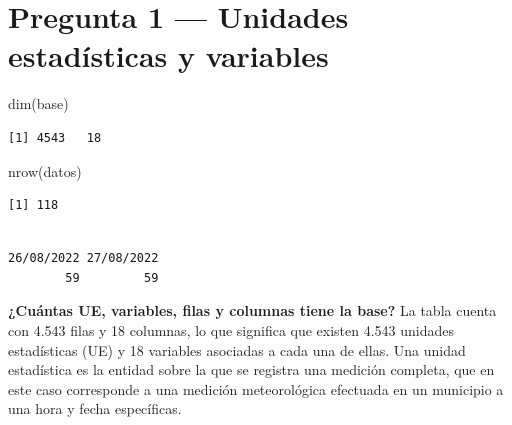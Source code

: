 \documentclass[oneside, openany, fontset=libertinus]{mitthesis}
\newenvironment{Shaded}{\begin{snugshade}}{\end{snugshade}}
\newcommand{\FunctionTok}[1]{\textcolor[rgb]{0.28,0.35,0.67}{#1}}
\newcommand{\NormalTok}[1]{\textcolor[rgb]{0.00,0.23,0.31}{#1}}
\newcommand{\SpecialCharTok}[1]{\textcolor[rgb]{0.37,0.37,0.37}{#1}}
\newenvironment{codres}%
  {\par\smallskip\noindent\begin{minipage}[t]{0.57\linewidth}\vspace{0pt}}%
  {\end{minipage}\par\medskip}
\newcommand{\codressep}{\end{minipage}\hfill\begin{minipage}[t]{0.40\linewidth}\vspace{0pt}}
\begin{document}
\section{Pregunta 1 --- Unidades estadísticas y variables}\label{p1}

\begin{codres}

\begin{Shaded}
\begin{Highlighting}[]
\FunctionTok{dim}\NormalTok{(base)}
\end{Highlighting}
\end{Shaded}

\codressep

\begin{verbatim}
[1] 4543   18
\end{verbatim}

\end{codres}

\begin{codres}

\begin{Shaded}
\begin{Highlighting}[]
\FunctionTok{nrow}\NormalTok{(datos)}
\end{Highlighting}
\end{Shaded}

\codressep

\begin{verbatim}
[1] 118
\end{verbatim}

\end{codres}

\begin{codres}

\begin{Shaded}
\end{Shaded}

\codressep

\begin{verbatim}

26/08/2022 27/08/2022 
        59         59 
\end{verbatim}

\end{codres}

\textbf{¿Cuántas UE, variables, filas y columnas tiene la base?} La
tabla cuenta con 4.543 filas y 18 columnas, lo que significa que existen
4.543 unidades estadísticas (UE) y 18 variables asociadas a cada una de
ellas. Una unidad estadística es la entidad sobre la que se registra una
medición completa, que en este caso corresponde a una medición
meteorológica efectuada en un municipio a una hora y fecha específicas.
\end{document}
